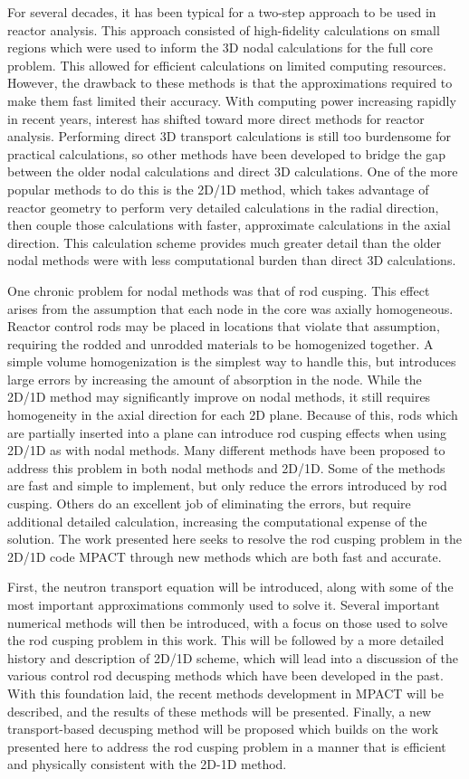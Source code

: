 For several decades, it has been typical for a two-step approach to be used in reactor analysis.  This approach consisted of high-fidelity calculations on small regions which were used to inform the 3D nodal calculations for the full core problem.  This allowed for efficient calculations on limited computing resources.  However, the drawback to these methods is that the approximations required to make them fast limited their accuracy.  With computing power increasing rapidly in recent years, interest has shifted toward more direct methods for reactor analysis.  Performing direct 3D transport calculations is still too burdensome for practical calculations, so other methods have been developed to bridge the gap between the older nodal calculations and direct 3D calculations.  One of the more popular methods to do this is the 2D/1D method, which takes advantage of reactor geometry to perform very detailed calculations in the radial direction, then couple those calculations with faster, approximate calculations in the axial direction.  This calculation scheme provides much greater detail than the older nodal methods were with less computational burden than direct 3D calculations.

One chronic problem for nodal methods was that of rod cusping.  This effect arises from the assumption that each node in the core was axially homogeneous.  Reactor control rods may be placed in locations that violate that assumption, requiring the rodded and unrodded materials to be homogenized together.  A simple volume homogenization is the simplest way to handle this, but introduces large errors by increasing the amount of absorption in the node.  While the 2D/1D method may significantly improve on nodal methods, it still requires homogeneity in the axial direction for each 2D plane.  Because of this, rods which are partially inserted into a plane can introduce rod cusping effects when using 2D/1D as with nodal methods.   Many different methods have been proposed to address this problem in both nodal methods and 2D/1D.  Some of the methods are fast and simple to implement, but only reduce the errors introduced by rod cusping.  Others do an excellent job of eliminating the errors, but require additional detailed calculation, increasing the computational expense of the solution.  The work presented here seeks to resolve the rod cusping problem in the 2D/1D code MPACT through new methods which are both fast and accurate.

First, the neutron transport equation will be introduced, along with some of the most important approximations commonly used to solve it.  Several important numerical methods will then be introduced, with a focus on those used to solve the rod cusping problem in this work.  This will be followed by a more detailed history and description of 2D/1D scheme, which will lead into a discussion of the various control rod decusping methods which have been developed in the past.  With this foundation laid, the recent methods development in MPACT will be described, and the results of these methods will be presented.  Finally, a new transport-based decusping method will be proposed which builds on the work presented here to address the rod cusping problem in a manner that is efficient and physically consistent with the 2D-1D method.